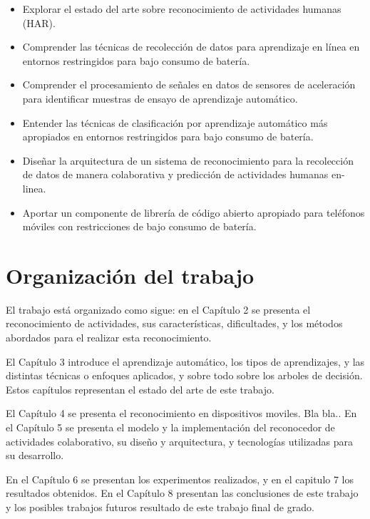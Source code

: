 \label{objetivos-especuxedficos}
\begin{itemize}
\item Explorar el estado del arte sobre reconocimiento de actividades humanas
(HAR). 
\item Comprender las técnicas de recolección de datos para aprendizaje en
línea en entornos restringidos para bajo consumo de batería. 
\item Comprender el procesamiento de señales en datos de sensores de aceleración
para identificar muestras de ensayo de aprendizaje automático. 
\item Entender las técnicas de clasificación por aprendizaje automático
más apropiados en entornos restringidos para bajo consumo de batería. 
\item Diseñar la arquitectura de un sistema de reconocimiento para la recolección
de datos de manera colaborativa y predicción de actividades humanas
en-linea. 
\item Aportar un componente de librería de código abierto apropiado para
teléfonos móviles con restricciones de bajo consumo de batería. 
\end{itemize}

\section{Organización del trabajo}

\label{organizaciuxf3n-del-trabajo}

El trabajo está organizado como sigue: en el Capítulo 2 se presenta
el reconocimiento de actividades, sus características, dificultades,
y los métodos abordados para el realizar esta reconocimiento.

El Capítulo 3 introduce el aprendizaje automático, los tipos de aprendizajes,
y las distintas técnicas o enfoques aplicados, y sobre todo sobre
los arboles de decisión. Estos capítulos representan el estado del
arte de este trabajo.

El Capítulo 4 se presenta el reconocimiento en dispositivos moviles.
Bla bla.. En el Capítulo 5 se presenta el modelo y la implementación
del reconocedor de actividades colaborativo, su diseño y arquitectura,
y tecnologías utilizadas para su desarrollo.

En el Capítulo 6 se presentan los experimentos realizados, y en el
capitulo 7 los resultados obtenidos. En el Capítulo 8 presentan las
conclusiones de este trabajo y los posibles trabajos futuros resultado
de este trabajo final de grado. 
